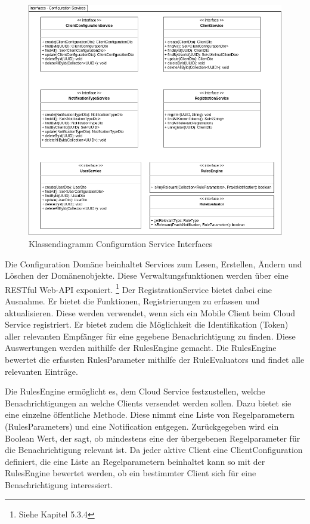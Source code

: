 \begin{figure}[h]
    \centering
    \begin{minipage}[b]{0.9\textwidth}
        \includegraphics[width=\textwidth]{graphics/Class_Configuration_Services}
        \caption{Klassendiagramm Configuration Service Interfaces}
    \end{minipage}
\end{figure}

Die Configuration Domäne beinhaltet Services zum Lesen, Erstellen, Ändern und Löschen der Domänenobjekte.
Diese Verwaltungsfunktionen werden über eine RESTful Web-API exponiert. \footnote{Siehe Kapitel 5.3.4}
Der RegistrationService bietet dabei eine Ausnahme.
Er bietet die Funktionen, Registrierungen zu erfassen und aktualisieren.
Diese werden verwendet, wenn sich ein Mobile Client beim Cloud Service registriert.
Er bietet zudem die Möglichkeit die Identifikation (Token) aller relevanten Empfänger für eine gegebene Benachrichtigung zu finden.
Diese Auswertungen werden mithilfe der RulesEngine gemacht.
Die RulesEngine bewertet die erfassten RulesParameter mithilfe der RuleEvaluators und findet alle relevanten Einträge.

Die RulesEngine ermöglicht es, dem Cloud Service festzustellen, welche Benachrichtigungen an welche Clients versendet werden sollen.
Dazu bietet sie eine einzelne öffentliche Methode.
Diese nimmt eine Liste von Regelparametern (RulesParameters) und eine Notification entgegen.
Zurückgegeben wird ein Boolean Wert, der sagt, ob mindestens eine der übergebenen Regelparameter für die Benachrichtigung relevant ist.
Da jeder aktive Client eine ClientConfiguration definiert, die eine Liste an Regelparametern beinhaltet kann so mit der RulesEngine bewertet werden, ob ein bestimmter Client sich für eine Benachrichtigung interessiert.

